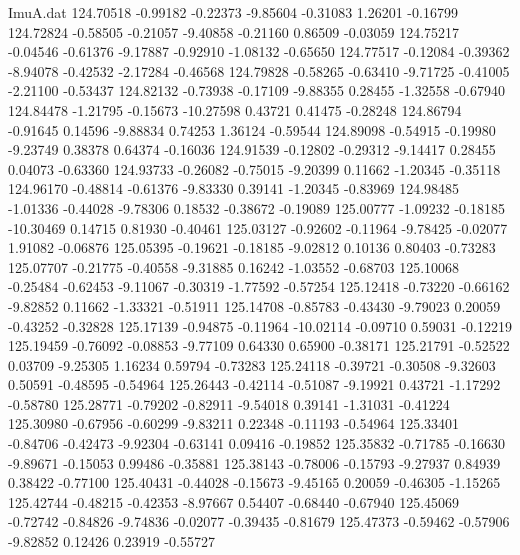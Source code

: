 \begin{filecontents}{ImuA.dat}
 124.70518   -0.99182   -0.22373   -9.85604   -0.31083    1.26201   -0.16799
 124.72824   -0.58505   -0.21057   -9.40858   -0.21160    0.86509   -0.03059
 124.75217   -0.04546   -0.61376   -9.17887   -0.92910   -1.08132   -0.65650
 124.77517   -0.12084   -0.39362   -8.94078   -0.42532   -2.17284   -0.46568
 124.79828   -0.58265   -0.63410   -9.71725   -0.41005   -2.21100   -0.53437
 124.82132   -0.73938   -0.17109   -9.88355    0.28455   -1.32558   -0.67940
 124.84478   -1.21795   -0.15673  -10.27598    0.43721    0.41475   -0.28248
 124.86794   -0.91645    0.14596   -9.88834    0.74253    1.36124   -0.59544
 124.89098   -0.54915   -0.19980   -9.23749    0.38378    0.64374   -0.16036
 124.91539   -0.12802   -0.29312   -9.14417    0.28455    0.04073   -0.63360
 124.93733   -0.26082   -0.75015   -9.20399    0.11662   -1.20345   -0.35118
 124.96170   -0.48814   -0.61376   -9.83330    0.39141   -1.20345   -0.83969
 124.98485   -1.01336   -0.44028   -9.78306    0.18532   -0.38672   -0.19089
 125.00777   -1.09232   -0.18185  -10.30469    0.14715    0.81930   -0.40461
 125.03127   -0.92602   -0.11964   -9.78425   -0.02077    1.91082   -0.06876
 125.05395   -0.19621   -0.18185   -9.02812    0.10136    0.80403   -0.73283
 125.07707   -0.21775   -0.40558   -9.31885    0.16242   -1.03552   -0.68703
 125.10068   -0.25484   -0.62453   -9.11067   -0.30319   -1.77592   -0.57254
 125.12418   -0.73220   -0.66162   -9.82852    0.11662   -1.33321   -0.51911
 125.14708   -0.85783   -0.43430   -9.79023    0.20059   -0.43252   -0.32828
 125.17139   -0.94875   -0.11964  -10.02114   -0.09710    0.59031   -0.12219
 125.19459   -0.76092   -0.08853   -9.77109    0.64330    0.65900   -0.38171
 125.21791   -0.52522    0.03709   -9.25305    1.16234    0.59794   -0.73283
 125.24118   -0.39721   -0.30508   -9.32603    0.50591   -0.48595   -0.54964
 125.26443   -0.42114   -0.51087   -9.19921    0.43721   -1.17292   -0.58780
 125.28771   -0.79202   -0.82911   -9.54018    0.39141   -1.31031   -0.41224
 125.30980   -0.67956   -0.60299   -9.83211    0.22348   -0.11193   -0.54964
 125.33401   -0.84706   -0.42473   -9.92304   -0.63141    0.09416   -0.19852
 125.35832   -0.71785   -0.16630   -9.89671   -0.15053    0.99486   -0.35881
 125.38143   -0.78006   -0.15793   -9.27937    0.84939    0.38422   -0.77100
 125.40431   -0.44028   -0.15673   -9.45165    0.20059   -0.46305   -1.15265
 125.42744   -0.48215   -0.42353   -8.97667    0.54407   -0.68440   -0.67940
 125.45069   -0.72742   -0.84826   -9.74836   -0.02077   -0.39435   -0.81679
 125.47373   -0.59462   -0.57906   -9.82852    0.12426    0.23919   -0.55727

\end{filecontents}
